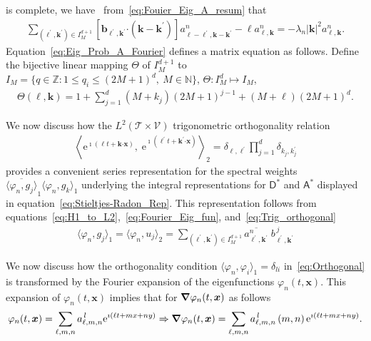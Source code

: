\documentclass[leqno,onefignum,onetabnum]{siamltex1213}
\newcommand{\e}{\mathrm{e}}
\newcommand{\Tc}{\mathcal{T}}
\newcommand{\Vc}{\mathcal{V}}
\newcommand{\Dm}{\mathsf{D}}
\newcommand{\Am}{\mathsf{A}}
\newcommand\bnabla{\mbox{\boldmath${\nabla}$}}
\providecommand\bcdot{\boldsymbol{\cdot}}
\newcommand{\vecb}{\boldsymbol{b}}
\newcommand{\vecx}{\boldsymbol{x}}
\newcommand{\veck}{\boldsymbol{k}}
\begin{document}
is complete, we have~\cite{Stone:64,Keener-2000}
from~\eqref{eq:Fouier_Eig_A_resum} that 
%
\begin{align}\label{eq:Eig_Prob_A_Fourier}
  \sum_{(\ell^\prime,\veck^\prime)\in I_M^{d+1}}
  \left[\vecb_{\ell^\prime,\veck^\prime}\bcdot(\veck-\veck^\prime)
       \right]a^n_{\ell-\ell^\prime,\veck-\veck^\prime}
  -\ell a^n_{\ell,\veck}
  =-\lambda_n|\veck|^2a^n_{\ell,\veck}.
\end{align}
%
Equation~\eqref{eq:Eig_Prob_A_Fourier} defines a matrix equation as
follows. Define the bijective linear mapping $\Theta$ of $I_M^{d+1}$ to 
$I_M=\{q\in\mathbb{Z}:1\leq q_i\leq(2M+1)^d, \ M\in\mathbb{N}\}$,
$\Theta:I^d_M\mapsto I_M$,  
%
\begin{align}
  \Theta(\ell,\veck)=1+\sum_{j=1}^{d}(M+k_j)(2M+1)^{j-1}+(M+\ell)(2M+1)^d.
\end{align}
%

We now discuss how the $L^2(\Tc\times\Vc)$ trigonometric orthogonality
relation   
%
\begin{align}\label{eq:Trig_orthogonal}  
      \left\langle
      \e^{\imath (\ell t+\veck\bcdot\vecx)},\;\e^{\imath (\ell^\prime t+\veck^\prime\bcdot\vecx)}
      \right\rangle_2
      =\delta_{\ell,\ell^\prime}\prod_{j=1}^d\delta_{k_j,k_j^\prime}
\end{align}
%
provides a convenient series representation for the spectral weights 
$\overline{\langle\varphi_n,g_j\rangle}_1\langle\varphi_n,g_k\rangle_1$ underlying the integral
representations for $\Dm^*$ and $\Am^*$ displayed in
equation~\eqref{eq:Stieltjes-Radon_Rep}. This representation follows
from equations~\eqref{eq:H1_to_L2},~\eqref{eq:Fourier_Eig_fun},
and~\eqref{eq:Trig_orthogonal} 
%
\begin{align}
  \langle\varphi_n,g_j\rangle_1=\langle\varphi_n,u_j\rangle_2=\sum_{(\ell^\prime,\veck^\prime)\in I_M^{d+1}}
   \overline{a^n_{\ell^\prime,\veck^\prime}}\;b^{\,j}_{\ell^\prime,\veck^\prime}
\end{align}
%



We now discuss how the orthogonality condition
$\langle\varphi_n,\varphi_i\rangle_1=\delta_{li}$ in~\eqref{eq:Orthogonal} is
transformed by the Fourier expansion of the
eigenfunctions $\varphi_n(t,\vecx)$. This expansion of $\varphi_n(t,\vecx)$ 
implies that for $\bnabla \varphi_n(t,\vecx)$ as follows 
%
\begin{align}\label{eq:Eigenfunction_Grad_expansion}
  \varphi_n(t,\vecx)=\sum_{\ell,m,n}a^{\,l}_{\ell,m,n}\e^{\imath (\ell t+mx+ny)}\Rightarrow
  \bnabla \varphi_n(t,\vecx)=\sum_{\ell,m,n}a^{\,l}_{\ell,m,n}\,(m,n)\,\e^{\imath (\ell t+mx+ny)}.
\end{align}
%
\end{document}
